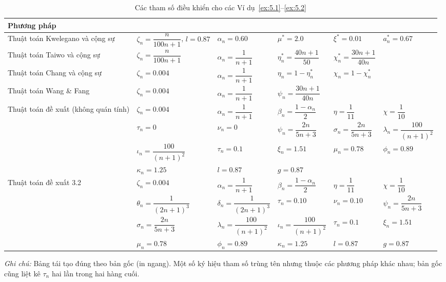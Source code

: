 \documentclass{MyBook}
\theoremstyle{plain}
\theoremstyle{definition}
\theoremstyle{remark}
\numberwithin{equation}{chapter}
\begin{document}
\begin{table}
\centering
\caption{Các tham số điều khiển cho các Ví dụ~\ref{ex:5.1}--\ref{ex:5.2}}\label{tab:1}
\small
\setlength{\tabcolsep}{8pt}
\renewcommand{\arraystretch}{1.6}
\begin{tabular}{@{}l l l l l l@{}}
\toprule
\textbf{Phương pháp} & & & & & \\
\midrule
Thuật toán Kwelegano và cộng sự &
$\zeta_n=\dfrac{n}{100n+1}$, $l=0.87$ & $\alpha_n=0.60$ & $\mu^{*}=2.0$ & $\xi^{*}=0.01$ & $a_n^{*}=0.67$ \\
Thuật toán Taiwo và cộng sự &
$\zeta_n=\dfrac{n}{100n+1}$ & $\alpha_n=\dfrac{1}{n+1}$ & $\eta_n^{*}=\dfrac{40n+1}{50}$ & $\chi_n^{*}=\dfrac{30n+1}{40n}$ & \\
Thuật toán Chang và cộng sự &
$\zeta_n=0.004$ & $\alpha_n=\dfrac{1}{n+1}$ & $\eta_n=1-\eta_n^{*}$ & $\chi_n=1-\chi_n^{*}$ & \\
Thuật toán Wang \& Fang &
$\zeta_n=0.004$ & $\alpha_n=\dfrac{1}{n+1}$ & $\psi_n=\dfrac{30n+1}{40n}$ & & \\
Thuật toán đề xuất (không quán tính) &
$\zeta_n=0.004$ & $\alpha_n=\dfrac{1}{n+1}$ & $\beta_n=\dfrac{1-\alpha_n}{2}$ & $\eta=\dfrac{1}{11}$ & $\chi=\dfrac{1}{10}$ \\
& $\tau_n=0$ & $\nu_n=0$ & $\psi_n=\dfrac{2n}{5n+3}$ & $\sigma_n=\dfrac{2n}{5n+3}$ & $\lambda_n=\dfrac{100}{(n+1)^2}$ \\
& $\iota_n=\dfrac{100}{(n+1)^2}$ & $\tau_n=0.1$ & $\xi_n=1.51$ & $\mu_n=0.78$ & $\phi_n=0.89$ \\
& $\kappa_n=1.25$ & $l=0.87$ & $g=0.87$ & & \\
Thuật toán đề xuất 3.2 &
$\zeta_n=0.004$ & $\alpha_n=\dfrac{1}{n+1}$ & $\beta_n=\dfrac{1-\alpha_n}{2}$ & $\eta=\dfrac{1}{11}$ & $\chi=\dfrac{1}{10}$ \\
& $\theta_n=\dfrac{1}{(2n+1)^3}$ & $\delta_n=\dfrac{1}{(2n+1)^3}$ & $\tau_n=0.10$ & $\nu_n=0.10$ & $\psi_n=\dfrac{2n}{5n+3}$ \\
& $\sigma_n=\dfrac{2n}{5n+3}$ & $\lambda_n=\dfrac{100}{(n+1)^2}$ & $\iota_n=\dfrac{100}{(n+1)^2}$ & $\tau_n=0.1$ & $\xi_n=1.51$ \\
& $\mu_n=0.78$ & $\phi_n=0.89$ & $\kappa_n=1.25$ & $l=0.87$ & $g=0.87$ \\
\bottomrule
\end{tabular}

\smallskip
\footnotesize\textit{Ghi chú:} Bảng tái tạo đúng theo bản gốc (in ngang). Một số ký hiệu tham số trùng tên nhưng thuộc các phương pháp khác nhau; bản gốc cũng liệt kê $\tau_n$ hai lần trong hai hàng cuối.
\end{table}
\end{document}
